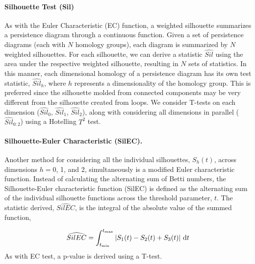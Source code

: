 \documentclass[12pt]{article}
\begin{document}

\paragraph{Silhouette Test (Sil)}
As with the Euler Characteristic (EC) function, a weighted silhouette summarizes a persistence diagram through a continuous function. Given a set of persistence diagrams (each with $N$ homology groups), each diagram is summarized by $N$ weighted silhouettes. For each silhouette, we can derive a statistic $\widehat{Sil}$ using the area under the respective weighted silhouette, resulting in $N$ sets of statistics. In this manner, each dimensional homology of a persistence diagram has its own test statistic, $\widehat{Sil}_{h}$, where $h$ represents a dimensionality of the homology group. This is preferred since the silhouette molded from connected components may be very different from the silhouette created from loops. We consider T-tests on each dimension ($\widehat{Sil}_0$, $\widehat{Sil}_1$, $\widehat{Sil}_2$), along with considering all dimensions in parallel ($\widehat{Sil}_{0:2}$) using a Hotelling $T^2$ test. 

\paragraph{Silhouette-Euler Characteristic (SilEC).}
Another method for considering all the individual silhouettes, $S_{h}(t)$, across dimensions $h = 0$, 1, and 2, simultaneously is a modified Euler characteristic function. Instead of calculating the alternating sum of Betti numbers, the Silhouette-Euler characteristic function (SilEC) is defined as the alternating sum of the individual silhouette functions across the threshold parameter, $t$. The statistic derived, $\widehat{SilEC}$, is the integral of the absolute value of the summed function,  

\[ \widehat{SilEC} = \int_{t_{\min}}^{t_{\max}} | S_{1}(t) - S_{2}(t) + S_{3}(t) | \ \textup{d}t \]
As with EC test, a p-value is derived using a T-test.
\end{document}
